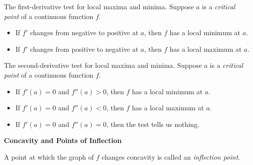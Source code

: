 \documentclass[12pt,addpoints, answers, fleqn]{exam}
\begin{document}
The first-derivative test for local maxima and minima. Suppose $a$ is a \emph{critical point} of a continuous function $f$.
\begin{itemize}
\item If $f'$ changes from negative to positive at $a$, then $f$ has a local minimum at $a$.
\item If $f'$ changes from positive to negative at $a$, then $f$ has a local maximum at $a$.
\end{itemize}
The second-derivative test for local maxima and minima. Suppose $a$ is a \emph{critical point} of a continuous function $f$.
\begin{itemize}
\item If $f'\left(a\right)=0$ and $f''\left(a\right)>0$, then $f$ has a local minimum at $a$.
\item If $f'\left(a\right)=0$ and $f''\left(a\right)<0$, then $f$ has a local maximum at $a$.
\item If $f'\left(a\right)=0$ and $f''\left(a\right)=0$, then the test tells us nothing.
\end{itemize}

\begin{center}
\textbf{Concavity and Points of Inflection}
\end{center}

A point at which the graph of $f$ changes concavity is called an \emph{inflection point}.
\end{document}
